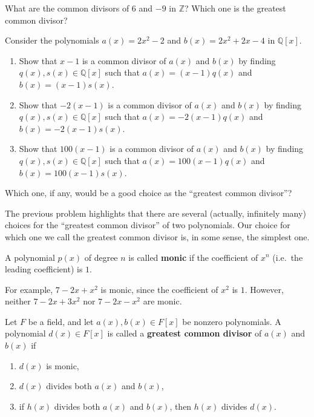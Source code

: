 \begin{problem}
What are the common divisors of $6$ and $-9$ in $\mathbb{Z}$? Which one is the greatest common divisor?
\end{problem}

\begin{problem}\label{prob.GCDExlore}
Consider the polynomials $a(x) = 2x^2-2$ and $b(x) = 2x^2+2x-4$ in $\mathbb{Q}[x]$.
\begin{enumerate}
\item Show that $x-1$ is a common divisor of $a(x)$ and $b(x)$ by finding  $q(x),s(x)\in \mathbb{Q}[x]$ such that $a(x) = (x-1)q(x)$ and $b(x) = (x-1)s(x)$.
\item Show that $-2(x-1)$ is a common divisor of $a(x)$ and $b(x)$ by finding  $q(x),s(x)\in \mathbb{Q}[x]$  such that $a(x) = -2(x-1)q(x)$ and $b(x) = -2(x-1)s(x)$.
\item Show that $100(x-1)$ is a common divisor of $a(x)$ and $b(x)$ by finding  $q(x),s(x)\in \mathbb{Q}[x]$ such that $a(x) = 100(x-1)q(x)$ and $b(x) = 100(x-1)s(x)$.
\end{enumerate}
Which one, if any, would be a good choice as the ``greatest common divisor''?
\end{problem}

The previous problem highlights that there are several (actually, infinitely many) choices for the ``greatest common divisor'' of two polynomials. Our choice for which one we call the greatest common divisor is, in some sense, the simplest one.

\begin{definition}
A polynomial $p(x)$ of degree $n$ is called \textbf{monic} if the coefficient of $x^n$ (i.e.~the leading coefficient) is $1$.
\end{definition}

For example, $7-2x+x^2$ is monic, since the coefficient of $x^2$ is $1$. However, neither $7-2x+3x^2$ nor $7-2x-x^2$ are monic.

\begin{definition}
Let $F$ be a field, and let $a(x), b(x)\in F[x]$ be nonzero polynomials. A polynomial $d(x)\in F[x]$ is called a \textbf{greatest common divisor} of $a(x)$ and $b(x)$ if
\begin{enumerate}
\item $d(x)$ is monic,
\item $d(x)$ divides both $a(x)$ and $b(x)$,
\item if $h(x)$ divides both $a(x)$ and $b(x)$, then $h(x)$ divides $d(x)$.
\end{enumerate}
\end{definition}

